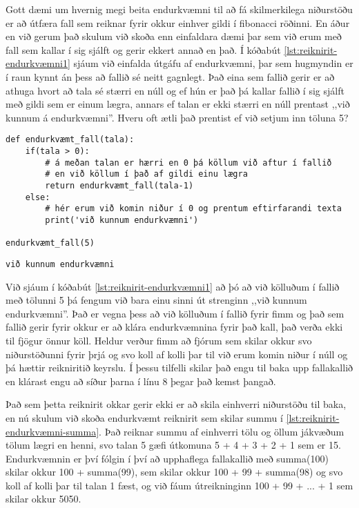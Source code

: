 Gott dæmi um hvernig megi beita endurkvæmni til að fá skilmerkilega niðurstöðu er að útfæra fall sem reiknar fyrir okkur einhver gildi í fibonacci röðinni.
En áður en við gerum það skulum við skoða enn einfaldara dæmi þar sem við erum með fall sem kallar í sig sjálft og gerir ekkert annað en það.
Í kóðabút \ref{lst:reiknirit-endurkvæmni1} sjáum við einfalda útgáfu af endurkvæmni, þar sem hugmyndin er í raun kynnt án þess að fallið sé neitt gagnlegt.
Það eina sem fallið gerir er að athuga hvort að tala sé stærri en núll og ef hún er það þá kallar fallið í sig sjálft með gildi sem er einum lægra, annars ef talan er ekki stærri en núll prentast ,,við kunnum á endurkvæmni''.
Hveru oft ætli það prentist ef við setjum inn töluna 5?

\begin{lstlisting}[caption=Endurkvæmni - einfalt, label=lst:reiknirit-endurkvæmni1]
def endurkvæmt_fall(tala):
	if(tala > 0):
		# á meðan talan er hærri en 0 þá köllum við aftur í fallið
		# en við köllum í það af gildi einu lægra
		return endurkvæmt_fall(tala-1)
	else:
		# hér erum við komin niður í 0 og prentum eftirfarandi texta
		print('við kunnum endurkvæmni')
		
endurkvæmt_fall(5)
\end{lstlisting}
\lstset{style=uttak}
\begin{lstlisting}
við kunnum endurkvæmni
\end{lstlisting}
\lstset{style=venjulegt}

Við sjáum í kóðabút \ref{lst:reiknirit-endurkvæmni1} að þó að við kölluðum í fallið með tölunni 5 þá fengum við bara einu sinni út strenginn ,,við kunnum endurkvæmni''.
Það er vegna þess að við kölluðum í fallið fyrir fimm og það sem fallið gerir fyrir okkur er að klára endurkvæmnina fyrir það kall, það verða ekki til fjögur önnur köll.
Heldur verður fimm að fjórum sem skilar okkur svo niðurstöðunni fyrir þrjá og svo koll af kolli þar til við erum komin niður í núll og þá hættir reikniritið keyrslu.
Í þessu tilfelli skilar það engu til baka upp fallakallið en klárast engu að síður þarna í línu 8 þegar það kemst þangað.


Það sem þetta reiknirit okkar gerir ekki er að skila einhverri niðurstöðu til baka, en nú skulum við skoða endurkvæmt reiknirit sem skilar summu í  \ref{lst:reiknirit-endurkvæmni-summa}.
Það reiknar summu af einhverri tölu og öllum jákvæðum tölum lægri en henni, svo talan 5 gæfi útkomuna 5 + 4 + 3 + 2 + 1 sem er 15.
Endurkvæmnin er því fólgin í því að upphaflega fallakallið með summa(100) skilar okkur 100 + summa(99), sem skilar okkur 100 + 99 + summa(98) og svo koll af kolli þar til talan 1 fæst, og við fáum útreikninginn 100 + 99 + ... + 1 sem skilar okkur 5050.

